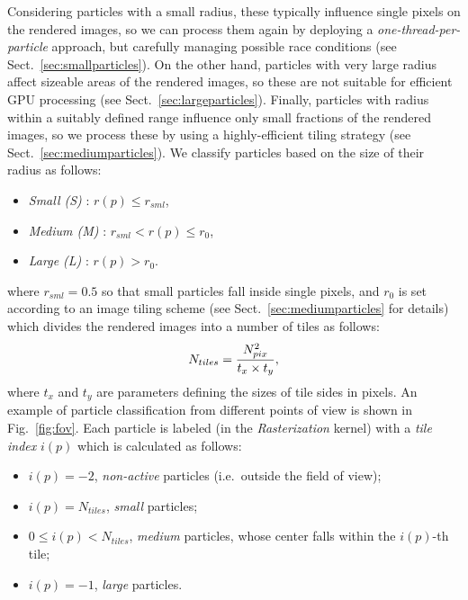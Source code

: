 \documentclass[smallextended]{svjour3}
\begin{document}
Considering particles with a small radius, these typically influence single pixels on the rendered images, so we can process them again by deploying a {\it one-thread-per-particle} approach, but carefully managing possible race conditions (see Sect.~\ref{sec:smallparticles}). On the other hand, particles with very large radius affect sizeable areas of the rendered images, so these are not suitable for efficient GPU processing (see Sect.~\ref{sec:largeparticles}). Finally, particles with radius within a suitably defined range influence only small fractions of the rendered images, so we process these by using a highly-efficient tiling strategy (see Sect.~\ref{sec:mediumparticles}). We classify particles based on the size of their radius as follows:

\begin{itemize}
\item
{\it Small (S)} : $r(p) \le r_{sml}$,
\item
{\it Medium (M)} : $r_{sml} < r(p) \le r_0$,
\item
{\it Large (L)} : $r(p) > r_0$.
\end{itemize}
where $r_{sml} = 0.5$ so that small particles fall inside single pixels, and 
$r_0$ is set according to an image tiling scheme (see Sect.~\ref{sec:mediumparticles} for details) which divides the rendered images
into a number of tiles as follows:  
\begin{equation}\label{tiles}
N_{tiles} = {N_{pix}^2\over t_x \times t_y},
\end{equation}
where $t_x$ and $t_y$ are parameters defining the sizes of tile sides in pixels.
An example of particle classification from different points of view is shown in Fig.~\ref{fig:fov}. Each particle is labeled (in the {\it Rasterization} kernel) with a {\it tile index} $i(p)$ which is calculated as follows:
\begin{itemize}
\item
$i(p) = -2$, {\it non-active} particles (i.e.\ outside the field of view);
\item
$i(p) = N_{tiles}$, {\it small} particles;
\item
$0 \le i(p) < N_{tiles}$, {\it medium} particles, whose center falls within the $i(p)$-th tile;
\item
$i(p) = -1$, {\it large} particles.
\end{itemize}
\end{document}
